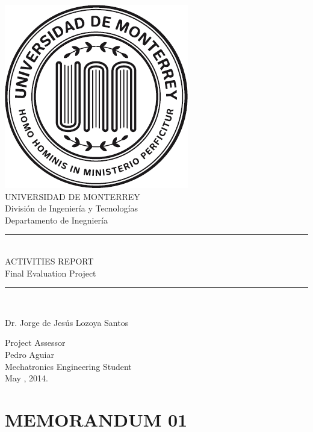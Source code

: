 \documentclass[paper=A4, fontsize=11pt, titlepage]{article}
\numberwithin{equation}{section}
\numberwithin{figure}{section}
\numberwithin{table}{section}
\newcommand{\horrule}[1]{\rule{\linewidth}{#1}}
\newcommand*{\sectionpostamble}{}
\newcommand*{\fromto}[1]{\def\sectionpostamble{#1}}
\begin{document}
  \begin{titlepage}
    \begin{center}
	\includegraphics[height=0.35\textwidth]{fig/udemlogo}\\
	\vspace{2mm}
	\huge UNIVERSIDAD DE MONTERREY\\
	\vspace{1mm}
	\Large División de Ingeniería y Tecnologías\\
	\vspace{1mm}
	\large Departamento de Inegniería\\
	\vspace{10mm}
	\horrule{1pt} \\[0.4cm]
	\Huge ACTIVITIES REPORT\\ 
	\large Final Evaluation Project\\
	\horrule{2pt} \\[0.5cm]
	\vspace{10mm}
	\Large\raggedright Dr. Jorge de Jesús Lozoya Santos\\
	\normalsize\raggedright Project Assessor\\
	\vspace{10mm}
	\Large\raggedleft Pedro Aguiar\\
	\normalsize\raggedleft Mechatronics Engineering Student\\
	\vspace{20mm}
	\Large\centering May , 2014.\\
    \end{center}
  \end{titlepage}

\tableofcontents
\clearpage
\listoffigures
\listoftables
\clearpage


\fromto{April 23 - Mayo 2}
\section{MEMORANDUM 01}
\end{document}
